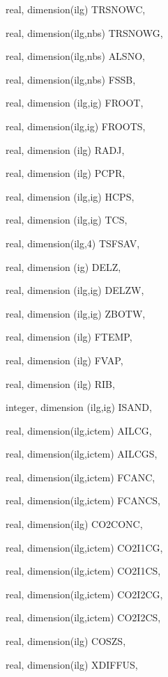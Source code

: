 {\begin{DoxyParamCaption}
\item[{real, dimension(ilg)}]{T\+R\+S\+N\+O\+W\+C, }
\item[{real, dimension(ilg,nbs)}]{T\+R\+S\+N\+O\+W\+G, }
\item[{real, dimension(ilg,nbs)}]{A\+L\+S\+N\+O, }
\item[{real, dimension(ilg,nbs)}]{F\+S\+S\+B, }
\item[{real, dimension (ilg,ig)}]{F\+R\+O\+O\+T, }
\item[{real, dimension(ilg,ig)}]{F\+R\+O\+O\+T\+S, }
\item[{real, dimension  (ilg)}]{R\+A\+D\+J, }
\item[{real, dimension  (ilg)}]{P\+C\+P\+R, }
\item[{real, dimension  (ilg,ig)}]{H\+C\+P\+S, }
\item[{real, dimension   (ilg,ig)}]{T\+C\+S, }
\item[{real, dimension(ilg,4)}]{T\+S\+F\+S\+A\+V, }
\item[{real, dimension  (ig)}]{D\+E\+L\+Z, }
\item[{real, dimension (ilg,ig)}]{D\+E\+L\+Z\+W, }
\item[{real, dimension (ilg,ig)}]{Z\+B\+O\+T\+W, }
\item[{real, dimension (ilg)}]{F\+T\+E\+M\+P, }
\item[{real, dimension  (ilg)}]{F\+V\+A\+P, }
\item[{real, dimension   (ilg)}]{R\+I\+B, }
\item[{integer, dimension (ilg,ig)}]{I\+S\+A\+N\+D, }
\item[{real, dimension(ilg,ictem)}]{A\+I\+L\+C\+G, }
\item[{real, dimension(ilg,ictem)}]{A\+I\+L\+C\+G\+S, }
\item[{real, dimension(ilg,ictem)}]{F\+C\+A\+N\+C, }
\item[{real, dimension(ilg,ictem)}]{F\+C\+A\+N\+C\+S, }
\item[{real, dimension(ilg)}]{C\+O2\+C\+O\+N\+C, }
\item[{real, dimension(ilg,ictem)}]{C\+O2\+I1\+C\+G, }
\item[{real, dimension(ilg,ictem)}]{C\+O2\+I1\+C\+S, }
\item[{real, dimension(ilg,ictem)}]{C\+O2\+I2\+C\+G, }
\item[{real, dimension(ilg,ictem)}]{C\+O2\+I2\+C\+S, }
\item[{real, dimension(ilg)}]{C\+O\+S\+Z\+S, }
\item[{real, dimension(ilg)}]{X\+D\+I\+F\+F\+U\+S, }

\end{DoxyParamCaption}}
